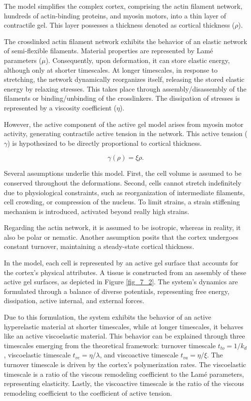 The model simplifies the complex cortex, comprising the actin filament network, hundreds of actin-binding proteins, and myosin motors, into a thin layer of contractile gel. This layer possesses a thickness denoted as cortical thickness ($\rho$).

The crosslinked actin filament network exhibits the behavior of an elastic network of semi-flexible filaments. Material properties are represented by Lamé parameters ($\mu$). Consequently, upon deformation, it can store elastic energy, although only at shorter timescales. At longer timescales, in response to stretching, the network dynamically reorganizes itself, releasing the stored elastic energy by relaxing stresses. This takes place through assembly/disassembly of the filaments or binding/unbinding of the crosslinkers. The dissipation of stresses is represented by a viscosity coefficient ($\eta$).

However, the active component of the active gel model arises from myosin motor activity, generating contractile active tension in the network. This active tension ($\gamma$) is hypothesized to be directly proportional to cortical thickness.

\begin{equation}
	\gamma(\rho) = \xi \rho.
\end{equation}

Several assumptions underlie this model. First, the cell volume is assumed to be conserved throughout the deformations. Second, cells cannot stretch indefinitely due to physiological constraints, such as reorganization of intermediate filaments, cell crowding, or compression of the nucleus. To limit strains, a strain stiffening mechanism is introduced, activated beyond really high strains.

Regarding the actin network, it is assumed to be isotropic, whereas in reality, it also be polar or nematic. Another assumption posits that the cortex undergoes constant turnover, maintaining a steady-state cortical thickness.

In the model, each cell is represented by an active gel surface that accounts for the cortex's physical attributes. A tissue is constructed from an assembly of these active gel surfaces, as depicted in Figure \ref{fig_7_2}. The system's dynamics are formulated through a balance of diverse potentials, representing free energy, dissipation, active internal, and external forces.

Due to this formulation, the system exhibits the behavior of an active hyperelastic material at shorter timescales, while at longer timescales, it behaves like an active viscoelastic material. This behavior can be explained through three timescales emerging from the theoretical framework: turnover timescale $t_{to} = 1/k_d$, viscoelastic timescale $t_{ve} = \eta/\lambda$, and viscoactive timescale $t_{va} = \eta/\xi$. The turnover timescale is driven by the cortex's polymerization rates. The viscoelastic timescale is a ratio of the viscous remodeling coefficient to the Lamé parameters, representing elasticity. Lastly, the viscoactive timescale is the ratio of the viscous remodeling coefficient to the coefficient of active tension.

